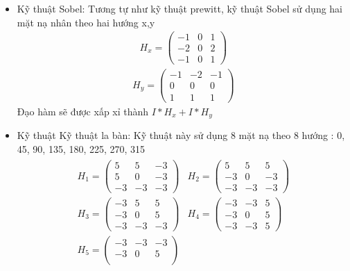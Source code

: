 \documentclass[12pt, oneside, a4]{book}
\begin{document}
\begin{itemize}
\item Kỹ thuật Sobel:
Tương tự như kỹ thuật prewitt, kỹ thuật Sobel sử dụng hai mặt nạ nhân theo hai hướng x,y
\begin{align*}
   H_x= \begin{pmatrix}
        -1 & 0 & 1 \\
        -2 & 0 & 2  \\
        -1 & 0 & 1
    \end{pmatrix}
\end{align*}
\begin{align*}
   H_y= \begin{pmatrix}
        -1 & -2 & -1 \\
        0 & 0 & 0  \\
        1 & 1 & 1
    \end{pmatrix}
\end{align*}
Đạo hàm sẽ được xấp xỉ thành $I\ast H_x+I\ast H_y$
\item Kỹ thuật Kỹ thuật la bàn: 
Kỹ thuật này sử dụng 8 mặt nạ theo 8 hướng : 0\degree, 45\degree, 90\degree, 135\degree, 180\degree, 225\degree, 270\degree, 315\degree
\begin{align*}
    \begin{matrix}
       H_1= \begin{pmatrix}
        5 & 5 & -3 \\
        5 & 0 & -3  \\
        -3 & -3 & -3
    \end{pmatrix} & H_2=\begin{pmatrix}
        5 & 5 & 5 \\
        -3 & 0 & -3  \\
        -3 & -3 & -3
    \end{pmatrix} \\
        H_3=\begin{pmatrix}
        -3 & 5 & 5 \\
        -3 & 0 & 5  \\
        -3 & -3 & -3
    \end{pmatrix} & H_4=\begin{pmatrix}
        -3 & -3 & 5 \\
        -3 & 0 & 5  \\
        -3 & -3 & 5
    \end{pmatrix}\\
       H_5= \begin{pmatrix}
        -3 & -3 & -3 \\
        -3 & 0 & 5  \\

\end{pmatrix}
\end{matrix}
\end{align*}
\end{itemize}
\end{document}
